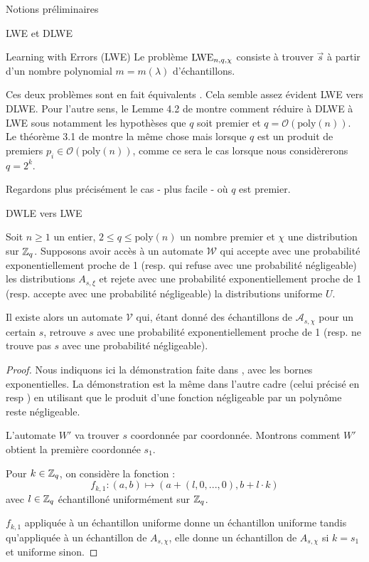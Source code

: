 \begin{section}{Notions préliminaires}
\begin{subsection}{LWE et DLWE}
\begin{definition}{Learning with Errors (LWE)}
	Le problème $\text{LWE}_{n,q,\chi}$ consiste à trouver $\vec{s}$ à partir d'un nombre polynomial $m = m(\lambda)$ d'échantillons.
	\end{definition}

	Ces deux problèmes sont en fait \og équivalents \fg. Cela semble assez évident LWE vers DLWE. Pour l'autre sens, 	le Lemme
	4.2 de \cite{STOC:Regev05} montre comment réduire à DLWE à LWE sous notamment les hypothèses que $q$ soit  
	premier et $q = \mathcal{O}(\text{poly}(n))$. Le théorème 3.1 de \cite{EPRINT:MicPei11} montre la même chose
	mais lorsque $q$ est un produit de premiers $p_i \in \mathcal{O}(\text{poly}(n))$, comme ce sera le cas lorsque
	nous considèrerons $q = 2^k$.

	Regardons plus précisément le cas - plus facile - où $q$ est premier.
	\begin{prop}{DWLE vers LWE}

	Soit $n \geqslant 1$ un entier, $2 \leqslant q \leqslant \text{poly}(n)$ un nombre premier et $\chi$ une
	distribution sur $\mathbb{Z}_q$. Supposons avoir accès à un automate $\mathcal{W}$ qui accepte avec une probabilité
	exponentiellement proche de 1 (resp. qui refuse avec une probabilité négligeable) les distributions $A_{s, \xi}$ et rejete avec une probabilité exponentiellement
	proche de 1 (resp. accepte avec une probabilité négligeable) la distributions uniforme $U$.
	
	Il existe alors un automate $\mathcal{V}$ qui, étant donné des échantillons de $\mathcal{A}_{s,\chi}$ pour un
	certain $s$, retrouve $s$ avec une probabilité exponentiellement proche de 1 (resp. ne trouve pas $s$ 
	avec une probabilité négligeable).
	\end{prop}
	\begin{proof}
	Nous indiquons ici la démonstration faite dans \cite{STOC:Regev05}, avec les bornes 
	exponentielles. La démonstration est la même dans l'autre cadre (celui précisé en \og resp \fg)
	en utilisant que le produit d'une fonction négligeable par un polynôme reste négligeable.
	
	L'automate $W'$ va trouver $s$ coordonnée par coordonnée. Montrons comment $W'$ obtient la première coordonnée $s_1$.
	
	Pour $k \in \mathbb{Z}_q$, on considère la fonction :
	\[f_{k,1}: (a,b) \mapsto (a + (l, 0, ..., 0), b + l \cdot k) \]
	avec $l\in \mathbb{Z}_q$ échantilloné uniformément sur $\mathbb{Z}_q$.
	
	$f_{k,1}$ appliquée à un échantillon uniforme donne un échantillon uniforme tandis qu'appliquée à un échantillon
	de $A_{s, \chi}$, elle donne un échantillon de $A_{s, \chi}$ si $k = s_1$ et uniforme sinon.
	

\end{proof}
\end{subsection}
\end{section}
